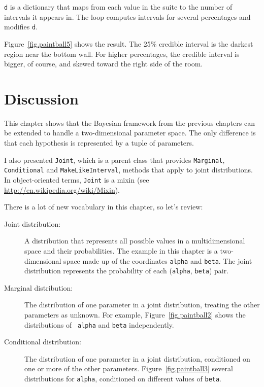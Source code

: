 \documentclass[12pt]{book}
\begin{document}
{\tt d} is a dictionary that maps from each value in the suite
to the number of intervals it appears in.  The loop computes intervals
for several percentages and modifies {\tt d}.

Figure~\ref{fig.paintball5} shows the result.  The 25\% credible
interval is the darkest region near the bottom wall.  For higher
percentages, the credible interval is bigger, of course, and skewed
toward the right side of the room.


\section{Discussion}

This chapter shows that the Bayesian framework from the previous
chapters can be extended to handle a two-dimensional parameter space.
The only difference is that each hypothesis is represented by
a tuple of parameters.

I also presented {\tt Joint}, which is a parent class that provides
{\tt Marginal}, {\tt Conditional} and {\tt MakeLikeInterval}, methods
that apply to joint distributions.  In object-oriented terms,
{\tt Joint} is a mixin (see \url{http://en.wikipedia.org/wiki/Mixin}).

There is a lot of new vocabulary in this chapter, so let's review:

\begin{description}

\item[Joint distribution:] A distribution that represents all possible
  values in a multidimensional space and their probabilities.  The
  example in this chapter is a two-dimensional space made up of the
  coordinates {\tt alpha} and {\tt beta}.  The joint distribution
  represents the probability of each ({\tt alpha}, {\tt beta}) pair.

\item[Marginal distribution:] The distribution of one parameter in a
  joint distribution, treating the other parameters as unknown.  For
  example, Figure~\ref{fig.paintball2} shows the distributions of {\tt
    alpha} and {\tt beta} independently.

\item[Conditional distribution:] The distribution of one parameter in
  a joint distribution, conditioned on one or more of the other
  parameters.  Figure~\ref{fig.paintball3} several distributions for
  {\tt alpha}, conditioned on different values of {\tt beta}.

\end{description}
\end{document}
